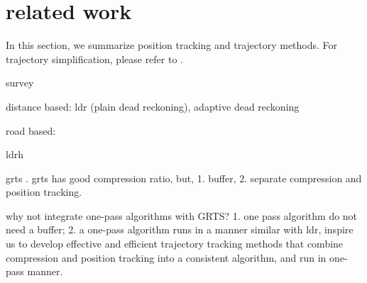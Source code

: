 
\section{related work}
\label{sec-related}

In this section, we summarize position tracking and trajectory methods. For trajectory simplification, please refer to \cite{Lin:Cised, Zhang:Evaluation}.



survey \cite{Leonhardi:Comparison} 

distance based: ldr (plain dead reckoning)\cite{Wolfson:PlainDR}, adaptive dead reckoning \cite{Wolfson:PositionTracking, Lam:AdaptiveDR} %

road based\cite{Wolfson:RoadTracking, Civilis:Techniques}: 


ldrh \cite{Trajcevski:LDRH}

grts \cite{Lange:GRTS, Lange:Tracking}. 
grts has good compression ratio, but, 1. buffer, 2. separate compression and position tracking.

why not integrate one-pass algorithms with GRTS? 
1. one pass algorithm do not need a buffer; 2. a one-pass algorithm runs in a manner similar with ldr, 
inspire us to develop effective and efficient trajectory tracking methods that combine compression and position tracking into a consistent algorithm, and run in one-pass manner. 




